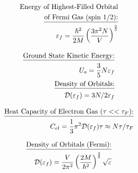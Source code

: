 \documentclass[12pt]{article}
\begin{document}
\begin{multicols}{2}

  \begin{equation*}
    \begin{split}
    \text{Energy of Highest-Filled Orbital}\\
    \text{\underline{of Fermi Gas (spin 1/2):}}\\
    \varepsilon_f=\frac{\hbar^2}{2M}\left( \frac{3\pi^2N}{V} \right)^{\frac{2}{3}}
    \end{split}
  \end{equation*}

  \begin{equation*}
    \begin{split}
    \text{\underline{Ground State Kinetic Energy:}}\\
    U_o=\frac{3}{5}N\varepsilon_f\\
    \text{\underline{Density of Orbitals:}}\\
    \mathcal{D}(\varepsilon_f)=3N/2\varepsilon_f
    \end{split}
  \end{equation*}

\end{multicols}

\vspace{-30pt}

\begin{multicols}{2}

  \begin{equation*}
    \begin{split}
      \text{\underline{Heat Capacity of Electron Gas ($\tau<<\tau_F$):}}\\
      C_{el}=\frac{1}{3}\pi^2\mathcal{D}(\varepsilon_f)\tau\approx N\tau/\tau_F
    \end{split}
  \end{equation*}

  \begin{equation*}
    \begin{split}
    \text{\underline{Density of Orbitals (Fermi):}}\\
    \mathcal{D}(\varepsilon_f)=\frac{V}{2\pi^2}\left( \frac{2M}{\hbar^2} \right)^{\frac{3}{2}}\sqrt{\varepsilon}
    \end{split}
  \end{equation*}

\end{multicols}
\end{document}
